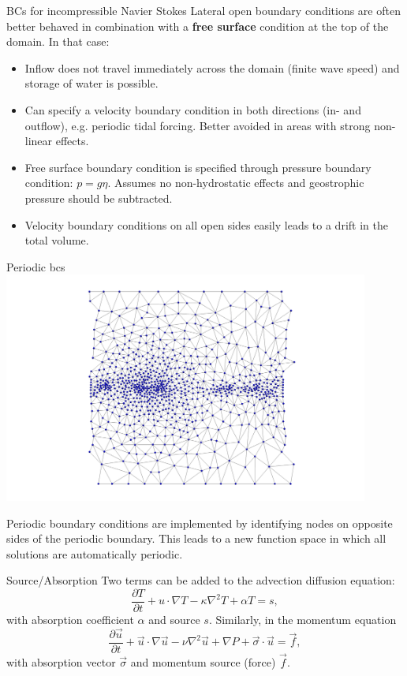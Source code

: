 \documentclass[12pt]{beamer}
\newcommand\pp[2]{\frac{\partial #1}{\partial #2}}
\newcommand\ppt[1]{\pp{#1}t}
\newcommand\grad\nabla
\renewcommand\emph[1]{{\bf #1}}
\begin{document}
\begin{frame}{BCs for incompressible Navier Stokes}
  Lateral open boundary conditions are often better behaved in combination
  with a \emph{free surface} condition at the top of the domain. In that case:
  \begin{itemize}
    \item Inflow does not travel immediately across the domain (finite wave speed)
      and  storage of water is possible.
    \item Can specify a velocity boundary condition in both directions (in-
      and outflow), e.g. periodic tidal forcing. Better avoided in
      areas with strong non-linear effects.
    \item Free surface boundary condition is specified through pressure boundary
      condition: $p=g\eta$. Assumes no non-hydrostatic effects and geostrophic pressure 
      should be subtracted.
    \item Velocity boundary conditions on  all open sides easily leads to
      a drift in the total volume.
  \end{itemize}
  
\end{frame}

\begin{frame}{Periodic bcs}
  \includegraphics[width=0.9\textwidth]{periodic}

  \vspace{-1em}
  Periodic boundary conditions are implemented by identifying nodes on opposite
  sides of the periodic boundary. This leads to a new function space in which
  all solutions are automatically periodic.
\end{frame}

\begin{frame}{Source/Absorption}
  Two terms can be added to the advection diffusion equation:
  \begin{equation*}
    \ppt T + u\cdot\grad T - \kappa\nabla^2 T + \alpha T = s,
  \end{equation*}
  with absorption coefficient $\alpha$ and source $s$. Similarly, in the
  momentum equation
  \begin{equation*}
    \ppt{\vec u} + \vec u\cdot\grad\vec u - \nu\nabla^2\vec u
      + \grad P + \vec\sigma\cdot\vec u = \vec f,
    \end{equation*}
  with absorption vector $\vec\sigma$ and momentum source (force) $\vec f$.
\end{frame}
\end{document}
